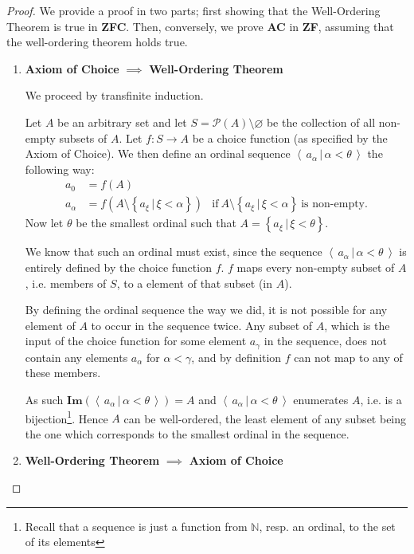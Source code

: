 \documentclass[../../main.tex]{subfiles}
\begin{document}
\begin{proof} \cite[p.39]{Jec78}
    We provide a proof in two parts; first showing that the Well-Ordering Theorem is true in \textbf{ZFC}.
    Then, conversely, we prove \textbf{AC} in \textbf{ZF}, assuming that the well-ordering theorem holds true.
    \begin{enumerate}
        \item \textbf{Axiom of Choice} $\implies$ \textbf{Well-Ordering Theorem}
        
        We proceed by transfinite induction.

        Let $A$ be an arbitrary set and let $S = \mathcal{P}(A) \setminus \varnothing$ be the collection of all non-empty subsets of $A$.
        Let $f: S \to A$ be a choice function (as specified by the Axiom of Choice).
        We then define an ordinal sequence $\left< \, a_{\alpha} \, \vert \, \alpha < \theta \, \right>$ the following way:
        \begin{align*}
            a_0 &= f(A)\\
            a_{\alpha} &= f\left(A \setminus \left\{a_\xi \, \vert \, \xi < \alpha\right\} \right)
            &\text{if}\ A \setminus \left\{a_\xi \, \vert \, \xi < \alpha\right\}\ \text{is non-empty}.
        \end{align*}
        Now let $\theta$ be the smallest ordinal such that $A = \left\{a_\xi \, \vert \, \xi < \theta\right\}$.
        
        We know that such an ordinal must exist, since the sequence $\left< \, a_{\alpha} \, \vert \, \alpha < \theta \, \right>$ is entirely defined by the choice function $f$.
        $f$ maps every non-empty subset of $A$, i.e. members of $S$, to a element of that subset (in $A$).
        
        By defining the ordinal sequence the way we did, it is not possible for any element of $A$ to occur in the sequence twice.
        Any subset of $A$, which is the input of the choice function for some element $a_\gamma$ in the sequence, does not contain any elements $a_\alpha$ for $\alpha < \gamma$, and by definition $f$ can not map to any of these members.
        
        As such $\mathbf{Im}\left(\left< \, a_{\alpha} \, \vert \, \alpha < \theta \, \right>\right) = A$
        and $\left< \, a_{\alpha} \, \vert \, \alpha < \theta \, \right>$ enumerates $A$, i.e. is a bijection\footnote{Recall that a sequence is just a function from $\mathbb{N}$, resp. an ordinal, to the set of its elements}.
        Hence $A$ can be well-ordered, the least element of any subset being the one which corresponds to the smallest ordinal in the sequence.
        \item \textbf{Well-Ordering Theorem} $\implies$ \textbf{Axiom of Choice}
        

\end{enumerate}
\end{proof}
\end{document}
